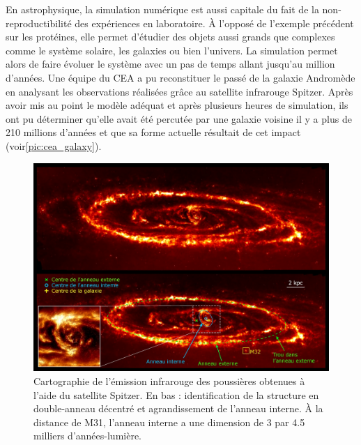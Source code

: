         En astrophysique, la simulation numérique est aussi capitale du fait de la non-reproductibilité des expériences en laboratoire.  À l'opposé de l'exemple précédent sur les protéines, elle permet d'étudier des objets aussi grands que complexes comme le système solaire, les galaxies ou bien l'univers. La simulation permet alors de faire évoluer le système avec un pas de temps allant jusqu'au million d'années. Une équipe du CEA a pu reconstituer le passé de la galaxie Andromède en analysant les observations réalisées grâce au satellite infrarouge Spitzer\cite{Block2006}. Après avoir mis au point le modèle adéquat et après plusieurs heures de simulation, ils ont pu déterminer qu'elle avait été percutée par une galaxie voisine il y a plus de 210 millions d'années et que sa forme actuelle résultait de cet impact (voir\autoref{pic:cea_galaxy}).
    
        
        \begin{figure}
            \center
            \includegraphics[width=12cm]{images/cea_galaxy.jpg}
            \caption{\label{pic:cea_galaxy} Cartographie de l'émission infrarouge des poussières  obtenues à l'aide du satellite Spitzer\protect\footnotemark. En bas : identification de la structure en double-anneau décentré et agrandissement de l'anneau interne. À la distance de M31, l'anneau interne a une dimension de 3 par 4.5 milliers d'années-lumière.}
        \end{figure}

